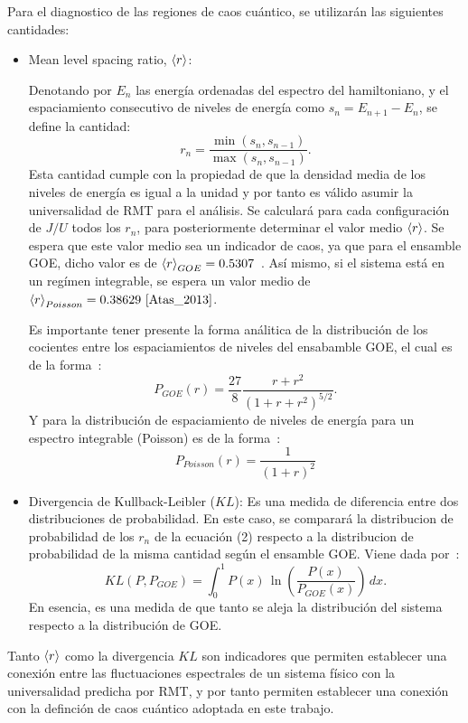 \documentclass[spanish,titlepage,table]{practicas}
\begin{document}
Para el diagnostico de las regiones de caos cuántico, se utilizarán las siguientes cantidades:
\begin{itemize}
    \item Mean level spacing ratio, $\ev{r}$:

Denotando por $E_n$ las energía ordenadas del espectro del hamiltoniano, y el espaciamiento consecutivo de niveles de energía como 
    $s_n=E_{n+1}-E_{n}$, se define la cantidad:
		\begin{equation}
			r_n=\frac{\min(s_n,s_{n-1})}{\max(s_n,s_{n-1})}.
		\end{equation}
    Esta cantidad cumple con la propiedad de que la densidad media de los niveles de energía es igual a la unidad
    y por tanto es válido asumir la universalidad de RMT para el análisis.
    Se calculará para cada configuración de $J/U$ todos los $r_n$, para posteriormente determinar el valor medio $\ev{r}$.
    Se espera que este valor medio sea un indicador de caos, ya que para el ensamble GOE, dicho valor es de $\ev{r}_{GOE}=0.5307$~\cite{Atas_2013}. Así mismo, si el sistema está 
    en un regímen integrable, se espera un valor medio de $\ev{r}_{Poisson}=0.38629~\cite{Atas_2013}$.
   
    Es importante tener presente la forma análitica de la distribución de los cocientes entre los espaciamientos de niveles del ensabamble GOE, el cual es de la forma~\cite{Atas_2013}:
\begin{equation}
    P_{GOE}(r)=\frac{27}{8}\frac{r+r^{2}}{(1+r+r^{2})^{5/2}}.
\end{equation}
Y para la distribución de espaciamiento de niveles de energía para un espectro integrable (Poisson) es de la forma~\cite{Tekur2020}:
\begin{equation}
    P_{Poisson}(r)=\frac{1}{(1+r)^{2}}
\end{equation}
    \item Divergencia de Kullback-Leibler ($KL$): Es una medida de diferencia entre dos distribuciones de probabilidad. En este caso, se comparará la distribucion de probabilidad de los $r_n$ de la ecuación (2)
    respecto a la distribucion de probabilidad de la misma cantidad según el ensamble GOE. Viene dada por~\cite{Pausch2022}:
    \begin{equation}
KL(P,P_{GOE}) = \int_{0}^{1} P(x) \, \ln \left( \frac{P(x)}{P_{GOE}(x)} \right) \, dx.
    \end{equation}
    En esencia, es una medida de que tanto se aleja la distribución del sistema respecto a la distribución de GOE.   
\end{itemize}
Tanto $\ev{r}$ como la divergencia $KL$ son indicadores que permiten establecer una conexión entre las fluctuaciones espectrales de un sistema físico 
con la universalidad predicha por RMT, y por tanto permiten establecer una conexión con la definción de caos cuántico adoptada en este trabajo.
\end{document}
